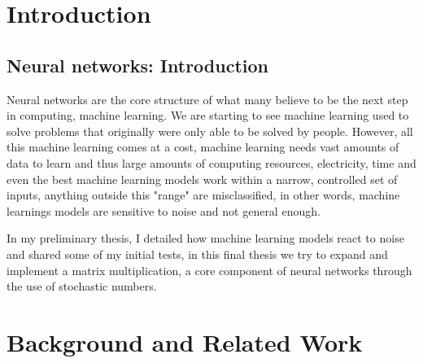 \documentclass[a4paper,oneside,phd,etd]{BYUPhys}
\begin{document}
 \frontmatter


 \makepreliminarypages


\doublespace
%

%

 \clearemptydoublepage
\singlespace
 \tableofcontents

\clearemptydoublepage
\listoffigures

\clearemptydoublepage

\clearemptydoublepage

\mainmatter
%
\chapter{Introduction}
\label{chap:Introduction}


\section{Neural networks: Introduction}
Neural networks are the core structure of what many believe to be the next step in computing, machine learning. We are starting to see machine learning used to solve problems that originally were only able to be solved by people\cite{bojarski2016end}. However, all this machine learning comes at a cost, machine learning needs vast amounts of data to learn and thus large amounts of computing resources, electricity, time and even the best machine learning models work within a narrow, controlled set of inputs, anything outside this "range" are misclassified, in other words, machine learnings models are sensitive to noise and not general enough.

In my preliminary thesis, I detailed how machine learning models react to noise and shared some of my initial tests, in this final thesis we try to expand and implement a matrix multiplication, a core component of neural networks through the use of stochastic numbers.

\chapter{Background and Related Work}
\end{document}
